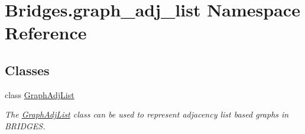 \hypertarget{namespace_bridges_1_1graph__adj__list}{}\section{Bridges.\+graph\+\_\+adj\+\_\+list Namespace Reference}
\label{namespace_bridges_1_1graph__adj__list}
\subsection*{Classes}
\begin{DoxyCompactItemize}
\item 
class \mbox{\hyperlink{class_bridges_1_1graph__adj__list_1_1_graph_adj_list}{Graph\+Adj\+List}}
\begin{DoxyCompactList}\small\item\em The \mbox{\hyperlink{class_bridges_1_1graph__adj__list_1_1_graph_adj_list}{Graph\+Adj\+List}} class can be used to represent adjacency list based graphs in B\+R\+I\+D\+G\+ES. \end{DoxyCompactList}\end{DoxyCompactItemize}
